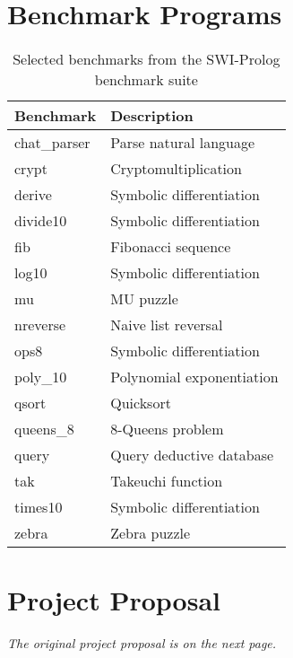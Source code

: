 \begin{appendices}
\chapter{Benchmark Programs}

\label{appendix:benchmarks}

\begin{table}[H]
\centering
\begin{tabular}{ll}
\hline
\textbf{Benchmark} & \textbf{Description} \\
\hline
chat\_parser & Parse natural language \\
crypt & Cryptomultiplication \\
derive & Symbolic differentiation \\
divide10 & Symbolic differentiation \\
fib & Fibonacci sequence \\
log10 & Symbolic differentiation \\
mu & MU puzzle \\
nreverse & Naive list reversal \\
ops8 & Symbolic differentiation \\
poly\_10 & Polynomial exponentiation \\
qsort & Quicksort \\
queens\_8 & 8-Queens problem \\
query & Query deductive database \\
tak & Takeuchi function \\
times10 & Symbolic differentiation \\
zebra & Zebra puzzle \\
\hline
\end{tabular}
\caption{Selected benchmarks from the SWI-Prolog benchmark suite}
\label{tab:benchmarks}
\end{table}

\chapter{Project Proposal}

\label{appendix:proposal}

\vfill

\begin{center}
\emph{The original project proposal is on the next page.}
\end{center}

\vspace{3cm}

\vfill

\newpage



\end{appendices}